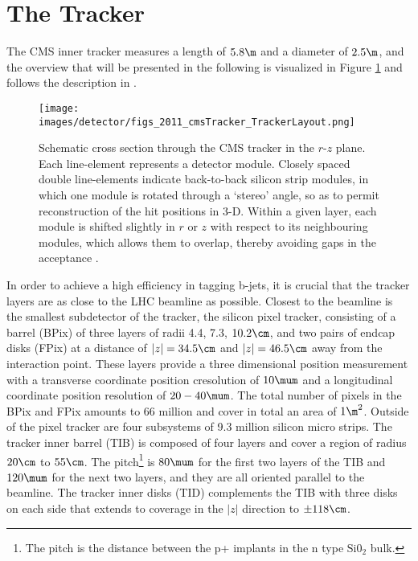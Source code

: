 \section{The Tracker}\label{sec:tracker}
\noindent\justify
The CMS inner tracker measures a length of $5.8\m$ and a diameter of $2.5\m$, and the overview that will be presented in the following is visualized in Figure \ref{fig:tracker} and follows the description in \cite{Chatrchyan:2014fea}. 
\begin{figure}[!htp]
  \centering
   \texttt{[image: images/detector/figs\_2011\_cmsTracker\_TrackerLayout.png]}
   \caption{Schematic cross section through the CMS tracker in the $r$-$z$ plane. Each line-element represents a detector module. Closely spaced double line-elements indicate back-to-back silicon strip modules, in which one module is rotated through a `stereo' angle, so as to permit reconstruction of the hit positions in 3-D. Within a given layer, each module is shifted slightly in $r$ or $z$ with respect to its neighbouring modules, which allows them to overlap, thereby avoiding gaps in the acceptance \cite{Chatrchyan:2014fea}.}
   \label{fig:tracker}
\end{figure}                                                                                            
In order to achieve a high efficiency in tagging b-jets, it is crucial that the tracker layers are as close to the LHC beamline as possible. 
Closest to the beamline is the smallest subdetector of the tracker, the silicon pixel tracker, consisting of a barrel (BPix) of three layers of radii 4.4, 7.3, $10.2\cm$, and two pairs of endcap disks (FPix) at a distance of $|z|=34.5\cm$ and $|z|=46.5\cm$ away from the interaction point. 
These layers provide a three dimensional position measurement with a transverse coordinate position cresolution of $10\mum$ and a longitudinal coordinate position resolution of $20-40\mum$.
The total number of pixels in the BPix and FPix amounts to 66 million and cover in total an area of $1\m^{2}$. 
Outside of the pixel tracker are four subsystems of 9.3 million silicon micro strips. 
The tracker inner barrel (TIB) is composed of four layers and cover a region of radius $20\cm$ to $55\cm$. 
The pitch\footnote{The pitch is the distance between the p+ implants in the n type $\mathrm{Si0_{2}}$ bulk.} is $80\mum$ for the first two layers of the TIB and $120\mum$ for the next two layers, and they are all oriented parallel to the beamline\cite{DAlfonso:2009vko}.
The tracker inner disks (TID) complements the TIB with three disks on each side that extends to coverage in the $|z|$ direction to $\pm118\cm$. 
